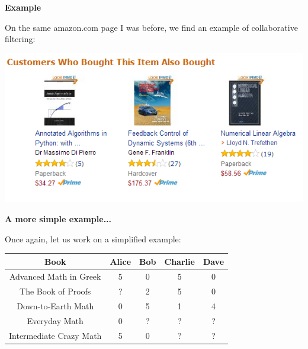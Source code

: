 \documentclass[xcolor=dvipsnames]{beamer}
\begin{document}
\begin{frame}
{\bf Example}

On the same amazon.com page I was before, we find an example of collaborative filtering:\vfill\pause

\begin{center}
\includegraphics[scale=.5]{cf.png}
\end{center}
\end{frame}

\begin{frame}
{\bf A more simple example...}

Once again, let us work on a simplified example:

\begin{center}
\begin{tabular}{| c | c | c | c | c |}
\hline
Book & Alice & Bob & Charlie & Dave \\
\hline
Advanced Math in Greek & 5 & 0 & 5 & 0\\
\hline
The Book of Proofs & ? & 2 & 5 & 0\\
\hline
Down-to-Earth Math & 0 & 5 & 1 & 4\\
\hline
Everyday Math & 0 & ? & ? & ? \\
\hline
Intermediate Crazy Math & 5 & 0 & ? & ?\\
\hline
\end{tabular}
\end{center}
\end{frame}
\end{document}
